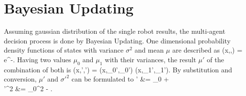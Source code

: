 \section{Bayesian Updating}
\label{sec:02_filter}

Assuming gaussian distribution of the single robot results,
the multi-agent decision process is done by Bayesian Updating.
One dimensional probability density functions of states with
variance $\sigma^2$ and mean $\mu$ are described as
\bal
    (x,\sigma,\mu) = e^{-}.
    \label{eq:02_probabilityDensity}
\eal
Having two values $\mu_0$ and $\mu_1$ with their variances,
the result $\mu'$ of the combination of both is
\bal
    (x,\sigma',\mu') = (x,\sigma_0',\mu_0') \cdot {}(x,\sigma_1',\mu_1').
    \label{eq:02_newProbabilityDensity}
\eal
By substitution and conversion, $\mu'$ and $\sigma'^2$ can be
formulated to
\bsub
\bal
    \mu' &= \mu_0 + \\
    \sigma'^2 &= \sigma_0^2 - .
\eal
\esub
